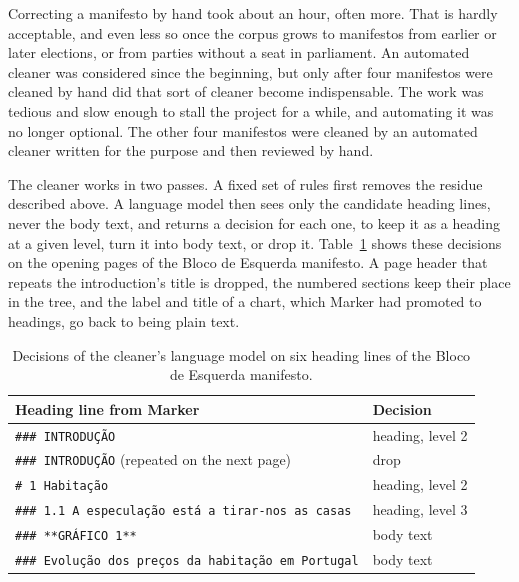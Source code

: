 Correcting a manifesto by hand took about an hour, often more. That is hardly
acceptable, and even less so once the corpus grows to manifestos from earlier
or later elections, or from parties without a seat in parliament. An automated
cleaner was considered since the beginning, but only after four manifestos were
cleaned by hand did that sort of cleaner become indispensable.
The work was tedious and slow enough to stall the project for a while, and
automating it was no longer optional. The other four manifestos were cleaned by
an automated cleaner written for the purpose and then reviewed by hand.

The cleaner works in two passes. A fixed set of rules first removes the
residue described above. A language model then sees only the candidate
heading lines, never the body text, and returns a decision for each one, to
keep it as a heading at a given level, turn it into body text, or drop it.
Table~\ref{tab:cleaner-plan} shows these decisions on the opening pages of
the Bloco de Esquerda manifesto. A page header that repeats the introduction's
title is dropped, the numbered sections keep their place in the tree, and the
label and title of a chart, which Marker had promoted to headings, go back to
being plain text.

\begin{table}[H]
    \centering
    \small
    \begin{tabular}{|l|l|}
        \hline
        \textbf{Heading line from Marker} & \textbf{Decision} \\
        \hline
        \texttt{\#\#\# INTRODUÇÃO} & heading, level 2 \\
        \texttt{\#\#\# INTRODUÇÃO} (repeated on the next page) & drop \\
        \texttt{\# 1 Habitação} & heading, level 2 \\
        \texttt{\#\#\# 1.1 A especulação está a tirar-nos as casas} & heading, level 3 \\
        \texttt{\#\#\# **GRÁFICO 1**} & body text \\
        \texttt{\#\#\# Evolução dos preços da habitação em Portugal} & body text \\
        \hline
    \end{tabular}
    \caption[Heading decisions by the cleaner]{Decisions of the cleaner's
    language model on six heading lines of the Bloco de Esquerda manifesto.}
    \label{tab:cleaner-plan}
\end{table}

